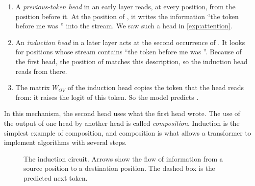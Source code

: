 \begin{enumerate}
\item A \emph{previous-token head} in an early layer reads, at every position, from the position before it. At
the position of \tok{[B]}, it writes the information ``the token before me was \tok{[A]}'' into the stream. We saw
such a head in \cref{exp:attention}.
\item An \emph{induction head} in a later layer acts at the second occurrence of \tok{[A]}. It looks for positions
whose stream contains ``the token before me was \tok{[A]}''. Because of the first head, the position of \tok{[B]}
matches this description, so the induction head reads from there.
\item The matrix $W_{OV}$ of the induction head copies the token that the head reads from: it raises the logit of
this token. So the model predicts \tok{[B]}.
\end{enumerate}
In this mechanism, the second head uses what the first head wrote. The use of the output of one head by another
head is called \emph{composition}. Induction is the simplest example of composition, and composition is what allows
a transformer to implement algorithms with several steps.

\begin{figure}[t]
\centering
{}
\caption{The induction circuit. Arrows show the flow of information from a source position to a destination
position. The dashed box is the predicted next token.}
\label{fig:induction}
\end{figure}

